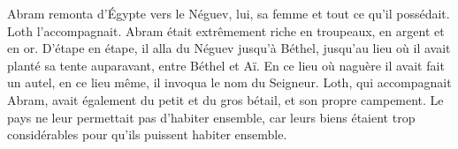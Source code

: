 Abram remonta d’Égypte vers le Néguev, lui, sa femme et tout ce qu’il possédait.
	Loth l’accompagnait.
Abram était extrêmement riche en troupeaux, en argent et en or.
D’étape en étape, il alla du Néguev jusqu’à Béthel,
	jusqu’au lieu où il avait planté sa tente auparavant, entre Béthel et Aï.
En ce lieu où naguère il avait fait un autel,
	en ce lieu même, il invoqua le nom du Seigneur.
Loth, qui accompagnait Abram,
	avait également du petit et du gros bétail, et son propre campement.
Le pays ne leur permettait pas d’habiter ensemble,
	car leurs biens étaient trop considérables pour qu’ils puissent habiter ensemble.
